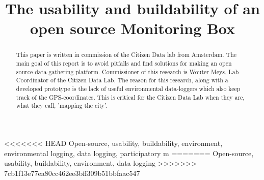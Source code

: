 \documentclass[conference]{IEEEtran}
\begin{document}
\title{The usability and buildability of an open source Monitoring Box}

\author{
	\and
		\and
		}
\maketitle	

\begin{abstract}
This paper is written in commission of the Citizen Data lab from Amsterdam. The main goal of this report is to avoid pitfalls and find solutions for making an open source data-gathering platform. Commissioner of this research is Wouter Meys, Lab Coordinator of the Citizen Data Lab. The reason for this research, along with a developed prototype is the lack of useful environmental data-loggers which also keep track of the GPS-coordinates. This is critical for the Citizen Data Lab when they are, what they call, 'mapping the city'. \\

\end{abstract}

\begin{IEEEkeywords}
<<<<<<< HEAD
Open-source, usability, buildability, environment, environmental logging, data logging, participatory m%
=======
Open-source, usability, buildability, environment, data logging
>>>>>>> 7cb1f13e77ea80cc462ee3bff309b51bbfaac547
\end{IEEEkeywords}
\end{document}
